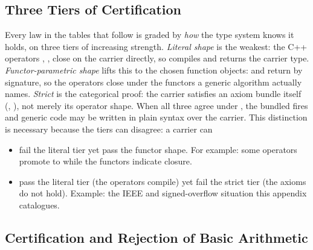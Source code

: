 \documentclass[11pt, a4paper]{article}
\begin{document}
\subsection{Three Tiers of Certification}
\label{par:concept-tiers}

Every law in the tables that follow is graded by \emph{how} the type system knows it holds, on three tiers of increasing strength.
\emph{Literal shape} is the weakest: the C++ operators \cppinline{+}, \cppinline{-}, \cppinline{*} close on the carrier directly, so  compiles and returns the carrier type.
\emph{Functor-parametric shape} lifts this to the chosen function objects:  and  return  by signature, so the operators close under the functors a generic algorithm actually names.
\emph{Strict} is the categorical proof: the carrier satisfies an axiom bundle itself (, ), not merely its operator shape.
When all three agree under , the bundled  fires and generic code may be written in plain syntax over the carrier.
This distinction is necessary because the tiers can disagree: a carrier can 
\begin{itemize}
\item fail the literal tier yet pass the functor shape. For example: some operators promote  to  while the functors indicate closure.
\item pass the literal tier (the operators compile) yet fail the strict tier (the axioms do not hold). Example: the IEEE and signed-overflow situation this appendix catalogues.
\end{itemize}

\clearpage
\subsection{Certification and Rejection of Basic Arithmetic}
\label{sec:numeric-tension}
\end{document}
